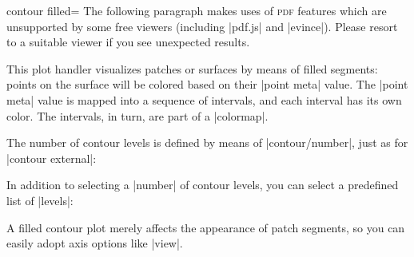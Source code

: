 {{\begin{plottype}[/pgfplots]{
    contour filled=\textcolor{black}{}%
}
    The following paragraph makes uses of \textsc{pdf} features which are
    unsupported by some free viewers (including |pdf.js| and |evince|). Please
    resort to a suitable viewer if you see unexpected results.

    This plot handler visualizes patches or surfaces by means of filled
    segments: points on the surface will be colored based on their |point meta|
    value. The |point meta| value is mapped into a sequence of intervals, and
    each interval has its own color. The intervals, in turn, are part of a
    |colormap|.
\pgfplotsexpensiveexample
\begin{codeexample}[]
\end{codeexample}
    The number of contour levels is defined by means of |contour/number|, just
    as for |contour external|:

\pgfplotsexpensiveexample
\begin{codeexample}[]
\end{codeexample}

    In addition to selecting a |number| of contour levels, you can select a
    predefined list of |levels|:
\pgfplotsexpensiveexample
\begin{codeexample}[]
\end{codeexample}
    A filled contour plot merely affects the appearance of patch segments, so
    you can easily adopt axis options like |view|.


\end{plottype}}}
